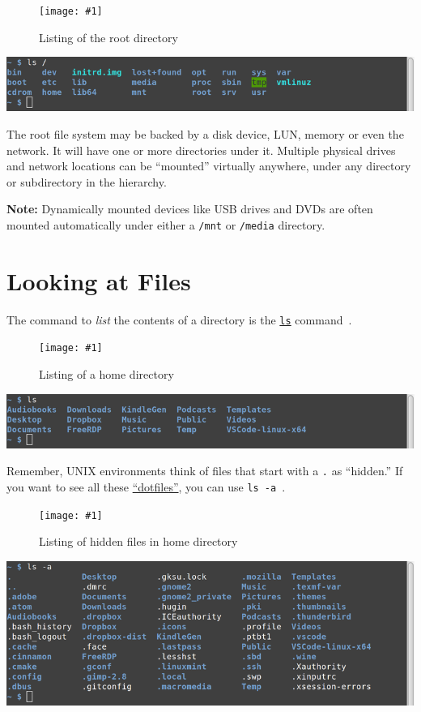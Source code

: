 \documentclass[10pt,]{book}
\numberwithin{figure}{chapter}
\DeclareRobustCommand{\fimg}[3]{
\ifxetex
\begin{figure}[H]
\texttt{[image: \#1]}
\caption{#2}
\label{fig:#3}
\end{figure}
\fi}
\DeclareRobustCommand{\fref}[1]{\ifxetex{(Figure \ref{fig:#1})}\fi}
\begin{document}
\ifxetex\fimg{./images/ls-root.png}{Listing of the root directory}{ls-root}
\else
\includegraphics{./images/ls-root.png} \fi

The root file system may be backed by a disk device, LUN, memory or even
the network. It will have one or more directories under it. Multiple
physical drives and network locations can be ``mounted'' virtually
anywhere, under any directory or subdirectory in the hierarchy.

\textbf{Note:} Dynamically mounted devices like USB drives and DVDs are
often mounted automatically under either a \texttt{/mnt} or
\texttt{/media} directory.

\section{Looking at Files}\label{looking-at-files}

The command to \emph{list} the contents of a directory is the
\href{http://linux.die.net/man/1/ls}{\texttt{ls}}
command~\fref{ls-home}.

\ifxetex\fimg{./images/ls-home.png}{Listing of a home directory}{ls-home}
\else
\includegraphics{./images/ls-home.png} \fi

Remember, UNIX environments think of files that start with a \texttt{.}
as ``hidden.'' If you want to see all these
\href{https://en.wikipedia.org/wiki/Hidden_file_and_hidden_directory\#Unix_and_Unix-like_environments}{``dotfiles''},
you can use \texttt{ls -a}~\fref{ls-a-home}.

\ifxetex\fimg{./images/ls-a-home.png}{Listing of hidden files in home directory}{ls-a-home}
\else
\includegraphics{./images/ls-a-home.png} \fi
\end{document}
